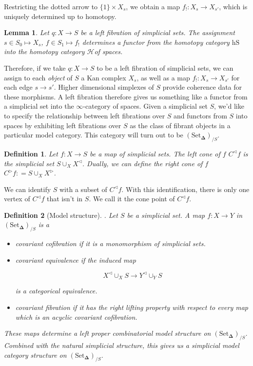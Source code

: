 \documentclass[12pt]{amsart}
\newcommand{\8}{\ensuremath{\infty}}
\renewcommand{\H}{\ensuremath{\mathcal{H}}}
\newcommand{\SSet}{\ensuremath{\text{Set}_{\boldsymbol{\Delta}}}}
\newtheorem{definition}{Definition}
\newtheorem{lemma}{Lemma}
\begin{document}
Restricting the dotted arrow to $\{1\}\times X_s$, we obtain a map $f_!: X_s \rightarrow X_{s'}$, which is uniquely determined up to homotopy.


\begin{lemma}
  Let $q : X \rightarrow S$ be a left fibration of simplicial sets. The assignment $s \in S_0 \mapsto X_s$, $f \in S_1 \mapsto f_!$ determines a functor from the homotopy category $\text{hS}$ into the homotopy category \H of spaces.
\end{lemma}

Therefore, if we take $q: X \rightarrow S$ to be a left fibration of simplicial sets, we can assign to each \emph{object} of $S$ a Kan complex $X_s$, as well as a map $f_{!}: X_s \rightarrow X_{s'}$ for each edge $s \rightarrow s'$. Higher dimensional simplexes of $S$ provide coherence data for these morphisms. A left fibration therefore gives us something like a functor from a simplicial set into the \8-category of spaces. Given a simplicial set $S$, we'd like to specify the relationship between left fibrations over $S$ and functors from $S$ into spaces by exhibiting left fibrations over $S$ as the class of fibrant objects in a particular model category. This category will turn out to be $(\SSet)_{/S}$.

\begin{definition}
  Let $f: X \rightarrow S$ be a map of simplicial sets. The left cone of $f$ $C^
      {\triangleleft}f$ is the simplicial set $\displaystyle S\cup_X X^{\triangleleft} $. Dually, we can define the right cone of $f$ $C^{\triangleright}f: =\displaystyle S\cup_X X^{\triangleright}$.
\end{definition}

We can identify $S$ with a subset of $C^{\triangleleft}f$. With this identification, there is only one vertex of $C^{\triangleleft}f$ that isn't in $S$. We call it the cone point of $C^{\triangleleft}f$.

\begin{definition}[Model structure]. Let $S$ be a simplicial set. A map $f: X \rightarrow Y$ in $(\SSet)_{/S}$ is a
  \begin{itemize}
    \item covariant cofibration if it is a monomorphism of simplicial sets.
    \item covariant equivalence if the induced map

          $$
            X^{\triangleleft}\displaystyle \cup_X S \rightarrow Y^{\triangleleft}\cup_Y S
          $$

          is a categorical equivalence.
    \item covariant fibration if it has the right lifting property with respect to every map which is an acyclic covariant cofibration.
  \end{itemize}
  These maps determine a left proper combinatorial model structure on $(\SSet)_{/S}$. Combined with the natural simplicial structure, this gives us a simplicial model category structure on $(\SSet)_{/S}$.
\end{definition}
\end{document}
